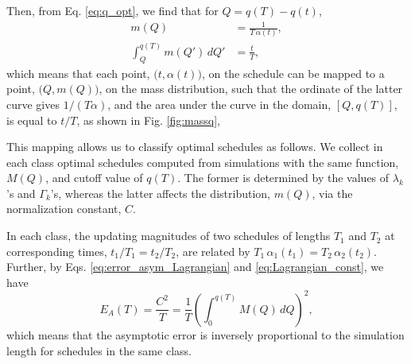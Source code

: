 \documentclass[reprint, superscriptaddress, floatfix]{revtex4-1}
\newcommand{\Err}{E}
\begin{document}
Then, from Eq. \eqref{eq:q_opt},
we find that for $Q = q(T) - q(t)$,
%
\begin{align}
  m(Q)
  &=
  \frac{ 1 }
       { T \, \alpha(t) }
  ,
\label{eq:mQ_invTa}
  \\
  \int_Q^{ q(T) }
    m(Q') \, dQ'
  &=
  \frac t T
  ,
\label{eq:intmQ_tT}
\end{align}
%
which means that each point,
$\bigl(t, \alpha(t)\bigr)$,
on the schedule can be mapped
to a point,
$\bigl(Q, m(Q)\bigr)$,
on the mass distribution,
such that the ordinate of the latter curve
gives $1/(T\alpha)$,
and the area under the curve in the domain, $[Q, q(T)]$,
is equal to $t/T$,
as shown in Fig. \ref{fig:massq},

This mapping allows us to classify optimal schedules
as follows.
%
We collect in each class optimal schedules
computed from simulations with the same function, $M(Q)$,
and cutoff value of $q(T)$.
%
The former is determined by the values of
$\lambda_k$'s and $\Gamma_k$'s,
whereas the latter affects the distribution, $m(Q)$,
via the normalization constant, $C$.


In each class, the updating magnitudes of two schedules
of lengths $T_1$ and $T_2$
at corresponding times, $t_1/T_1 = t_2/T_2$,
are related by $T_1 \, \alpha_1(t_1) = T_2 \, \alpha_2(t_2)$.
%
Further, by Eqs.
\eqref{eq:error_asym_Lagrangian}
and
\eqref{eq:Lagrangian_const},
we have
%
\begin{equation}
  \Err_A(T)
  =
  \frac { C^2 } { T }
  =
  \frac 1 T
  \left(
    \int_0^{ q(T) } M(Q) \, dQ
  \right)^2
  ,
\label{eq:error_asym2}
\end{equation}
%
which means that the asymptotic error
is inversely proportional to the simulation length
for schedules in the same class.


\end{document}
